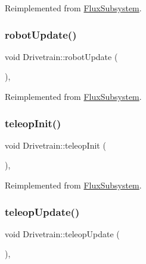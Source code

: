 Reimplemented from \hyperlink{classFluxSubsystem_aacd5ddfcadda0866d5e838de09a60d63}{Flux\+Subsystem}.

\mbox{\label{classDrivetrain_a2a2b5976426dc0c1f45438fd7a5926e4}} 
\subsubsection{\texorpdfstring{robot\+Update()}{robotUpdate()}}
{\footnotesize\ttfamily void Drivetrain\+::robot\+Update (\begin{DoxyParamCaption}{ }\end{DoxyParamCaption})\hspace{0.3cm}{\ttfamily [override]}, {\ttfamily [virtual]}}



Reimplemented from \hyperlink{classFluxSubsystem_ac2b1c08b53251870e945edf7080c1549}{Flux\+Subsystem}.

\mbox{\label{classDrivetrain_a12d7edbb3a1b5d4ffa4ecb381c1ab115}} 
\subsubsection{\texorpdfstring{teleop\+Init()}{teleopInit()}}
{\footnotesize\ttfamily void Drivetrain\+::teleop\+Init (\begin{DoxyParamCaption}{ }\end{DoxyParamCaption})\hspace{0.3cm}{\ttfamily [override]}, {\ttfamily [virtual]}}



Reimplemented from \hyperlink{classFluxSubsystem_aec6d05e4f80c3783684598fb92ad2e55}{Flux\+Subsystem}.

\mbox{\label{classDrivetrain_a3b6bdf96a9388285c7560b2fedfc7ca1}} 
\subsubsection{\texorpdfstring{teleop\+Update()}{teleopUpdate()}}
{\footnotesize\ttfamily void Drivetrain\+::teleop\+Update (\begin{DoxyParamCaption}{ }\end{DoxyParamCaption})\hspace{0.3cm}{\ttfamily [override]}, {\ttfamily [virtual]}}



